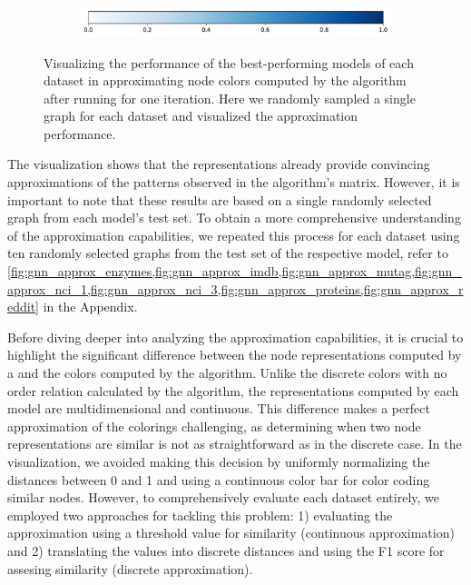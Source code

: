 \begin{figure}[!htb]
\begin{subfigure}[b]{0.49\textwidth}
		\vspace*{-5ex}
        \caption{\reddit}
	\end{subfigure}
	\par\bigskip
	\begin{subfigure}[t]{0.6\textwidth}
		\centering
		\includegraphics[width=\textwidth]{Figures/colorbar.pdf}
	\end{subfigure}
	\caption{Visualizing the performance of the best-performing \gnn models of each dataset in approximating node colors computed by the \wl algorithm after running for one iteration. Here we randomly sampled a single graph for each dataset and visualized the approximation performance.}
	\label{fig:gnn_approx}
\end{figure}

The visualization shows that the \gnn representations already provide convincing approximations of the patterns observed in the \wl algorithm's matrix. However, it is important to note that these results are based on a single randomly selected graph from each model's test set. To obtain a more comprehensive understanding of the approximation capabilities, we repeated this process for each dataset using ten randomly selected graphs from the test set of the respective \gnn model, refer to \cref{fig:gnn_approx_enzymes,fig:gnn_approx_imdb,fig:gnn_approx_mutag,fig:gnn_approx_nci_1,fig:gnn_approx_nci_3,fig:gnn_approx_proteins,fig:gnn_approx_reddit} in the Appendix.

Before diving deeper into analyzing the approximation capabilities, it is crucial to highlight the significant difference between the node representations computed by a \gnn and the colors computed by the \wl algorithm. Unlike the discrete colors with no order relation calculated by the \wl algorithm, the representations computed by each \gnn model are multidimensional and continuous. This difference makes a perfect approximation of the \wl colorings challenging, as determining when two node representations are similar is not as straightforward as in the discrete \wl case. In the visualization, we avoided making this decision by uniformly normalizing the distances between 0 and 1 and using a continuous color bar for color coding similar nodes. However, to comprehensively evaluate each dataset entirely, we employed two approaches for tackling this problem: 1) evaluating the approximation using a threshold value for similarity (continuous approximation) and 2) translating the values into discrete distances and using the F1 score for assesing similarity (discrete approximation).

